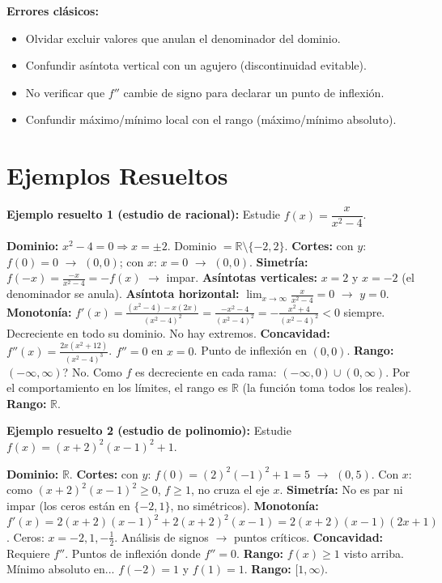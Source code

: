 \documentclass[12pt, letterpaper]{article}
\begin{document}
\begin{cuadroadvertencia}
  \textbf{Errores clásicos:}
  \begin{itemize}
    \item Olvidar excluir valores que anulan el denominador del dominio.
    \item Confundir asíntota vertical con un agujero (discontinuidad evitable).
    \item No verificar que $f''$ cambie de signo para declarar un punto de inflexión.
    \item Confundir máximo/mínimo local con el rango (máximo/mínimo absoluto).
  \end{itemize}
\end{cuadroadvertencia}

\newpage
\section{Ejemplos Resueltos}

\noindent\textbf{Ejemplo resuelto 1 (estudio de racional):} Estudie $f(x) = \dfrac{x}{x^2 - 4}$.

\begin{cuadrosolucion}
  \textbf{Dominio:} $x^2 - 4 = 0 \Rightarrow x = \pm 2$. Dominio $= \mathbb{R} \setminus \{-2, 2\}$.
  \textbf{Cortes:} con $y$: $f(0) = 0$ $\to$ $(0,0)$; con $x$: $x = 0$ $\to$ $(0,0)$.
  \textbf{Simetría:} $f(-x) = \frac{-x}{x^2-4} = -f(x)$ $\to$ impar.
  \textbf{Asíntotas verticales:} $x = 2$ y $x = -2$ (el denominador se anula).
  \textbf{Asíntota horizontal:} $\lim_{x\to\infty}\frac{x}{x^2-4} = 0$ $\to$ $y = 0$.
  \textbf{Monotonía:} $f'(x) = \frac{(x^2-4) - x(2x)}{(x^2-4)^2} = \frac{-x^2-4}{(x^2-4)^2} = -\frac{x^2+4}{(x^2-4)^2} < 0$ siempre. Decreciente en todo su dominio. No hay extremos.
  \textbf{Concavidad:} $f''(x) = \frac{2x(x^2+12)}{(x^2-4)^3}$. $f''=0$ en $x=0$. Punto de inflexión en $(0,0)$.
  \textbf{Rango:} $(-\infty, \infty)$? No. Como $f$ es decreciente en cada rama: $(-\infty, 0) \cup (0, \infty)$. Por el comportamiento en los límites, el rango es $\mathbb{R}$ (la función toma todos los reales). \textbf{Rango:} $\mathbb{R}$.
\end{cuadrosolucion}

\noindent\textbf{Ejemplo resuelto 2 (estudio de polinomio):} Estudie $f(x) = (x+2)^2(x-1)^2 + 1$.

\begin{cuadrosolucion}
  \textbf{Dominio:} $\mathbb{R}$.
  \textbf{Cortes:} con $y$: $f(0) = (2)^2(-1)^2+1 = 5$ $\to$ $(0,5)$. Con $x$: como $(x+2)^2(x-1)^2 \ge 0$, $f \ge 1$, no cruza el eje $x$.
  \textbf{Simetría:} No es par ni impar (los ceros están en $\{-2, 1\}$, no simétricos).
  \textbf{Monotonía:} $f'(x) = 2(x+2)(x-1)^2 + 2(x+2)^2(x-1) = 2(x+2)(x-1)(2x+1)$. Ceros: $x = -2, 1, -\frac{1}{2}$. Análisis de signos $\to$ puntos críticos.
  \textbf{Concavidad:} Requiere $f''$. Puntos de inflexión donde $f'' = 0$.
  \textbf{Rango:} $f(x) \ge 1$ visto arriba. Mínimo absoluto en... $f(-2) = 1$ y $f(1) = 1$. \textbf{Rango:} $[1, \infty)$.
\end{cuadrosolucion}
\end{document}
